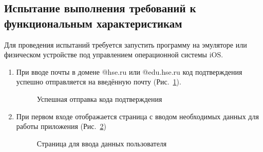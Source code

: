\documentclass{../includes/TechDoc}
\begin{document}
    \subsection{Испытание выполнения требований к функциональным характеристикам}

    Для проведения испытаний требуется запустить программу на эмуляторе или физическом устройстве под управлением операционной системы iOS\@.

    \begin{enumerate}
        \item При вводе почты в домене @hse.ru или @edu.hse.ru код подтверждения успешно отправляется на введённую почту (Рис.~\ref{fig:login_code_success}).
        \begin{figure}[h]
            \centering
            \caption{Успешная отправка кода подтверждения}
            \label{fig:login_code_success}
        \end{figure}

        \item При первом входе отображается страница с вводом необходимых данных для работы приложения (Рис.~\ref{fig:wait_page})
        \begin{figure}[h]
            \centering
            \caption{Страница для ввода данных пользователя}
            \label{fig:wait_page}
        \end{figure}


\end{enumerate}
\end{document}
